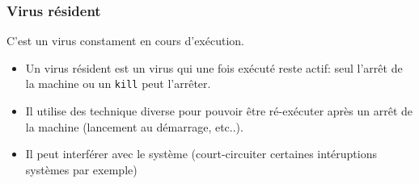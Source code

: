 \documentclass{beamer}
\begin{document}



\begin{frame}
\frametitle{Virus résident}
C'est un virus {\color{blue} constament en cours d'exécution. }
\begin{itemize}
\item Un virus résident est un virus qui une fois exécuté reste actif: seul l'arrêt de la machine ou un \texttt{kill} peut l'arrêter.
\item Il utilise des technique diverse pour pouvoir être ré-exécuter après un arrêt de la machine (lancement au démarrage, etc..).
\item Il peut interférer avec le système (court-circuiter certaines intéruptions systèmes par exemple)
\end{itemize}
\end{frame}






\end{document}
